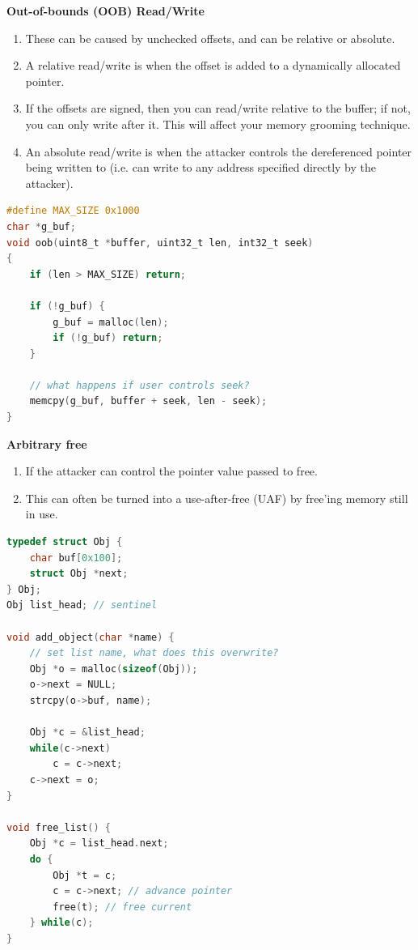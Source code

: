 \documentclass[12pt]{Training}
\begin{document}
\textbf{Out-of-bounds (OOB) Read/Write}
\begin{enumerate}
    \item These can be caused by unchecked offsets, and can be relative or absolute.
    \item A relative read/write is when the offset is added to a dynamically allocated pointer.
    \item If the offsets are signed, then you can read/write relative to the buffer; if not, you can only write after it. This will affect your memory grooming technique.
    \item An absolute read/write is when the attacker controls the dereferenced pointer being written to (i.e. can write to any address specified directly by the attacker).
\end{enumerate}
\begin{sectionbox}
\begin{lstlisting}[language=C, caption={Out-of-bound Read}]
#define MAX_SIZE 0x1000
char *g_buf;
void oob(uint8_t *buffer, uint32_t len, int32_t seek)
{
    if (len > MAX_SIZE) return;

    if (!g_buf) {
        g_buf = malloc(len);
        if (!g_buf) return;
    }

    // what happens if user controls seek?
    memcpy(g_buf, buffer + seek, len - seek);
}
\end{lstlisting}
\end{sectionbox}

\textbf{Arbitrary free}
\begin{enumerate}
    \item If the attacker can control the pointer value passed to free.
    \item This can often be turned into a use-after-free (UAF) by free'ing memory still in use.
\end{enumerate}
\begin{sectionbox}
\begin{lstlisting}[language=C, caption={Arbitrary Free}]
typedef struct Obj {
    char buf[0x100];
    struct Obj *next;
} Obj;
Obj list_head; // sentinel

void add_object(char *name) {
    // set list name, what does this overwrite?
    Obj *o = malloc(sizeof(Obj));
    o->next = NULL;
    strcpy(o->buf, name);

    Obj *c = &list_head;
    while(c->next)
        c = c->next;
    c->next = o;
}

void free_list() {
    Obj *c = list_head.next;
    do {
        Obj *t = c;
        c = c->next; // advance pointer
        free(t); // free current
    } while(c);
}
\end{lstlisting}
\end{sectionbox}
\end{document}
